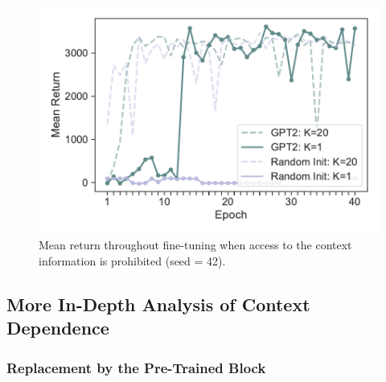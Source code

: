 \documentclass{article}
\begin{document}
\begin{figure}[H]
    \begin{minipage}[b]{0.32\linewidth}
        \includegraphics[width=\linewidth]{figs/returnmean_gpt2_dt_K1_walker2d_medium_42.pdf}
    \end{minipage}
    \caption{Mean return throughout fine-tuning when access to the context information is prohibited (seed = 42).}
    \label{fig:return-mean-42}
\end{figure}

\begin{table}[H]
  \caption{Normalized return of $K = 1$ (seed = 666 \& 42).}
  \label{table:k=1-666-42}
  \centering
\end{table}

\subsection{More In-Depth Analysis of Context Dependence}
\label{appendix:results-for-other-conditions-internal-analysis-to-see-the-dependence-on-context}

\subsubsection{Replacement by the Pre-Trained Block}
\label{appendix:results-for-other-conditions-replacement}
\end{document}

